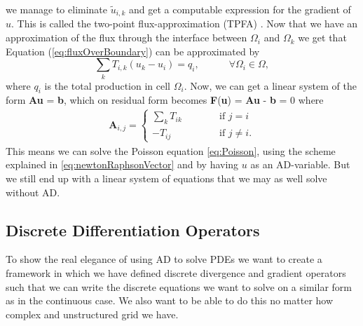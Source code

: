we manage to eliminate $\tilde{u}_{i,k}$ and get a computable expression for the gradient of $u$. This is called the two-point flux-approximation (TPFA) \emph{\citep{lieMrstUrl}}. Now that we have an approximation of the flux through the interface between $\Omega_i$ and $\Omega_k$ we get that Equation (\ref{eq:fluxOverBoundary}) can be approximated by 
\begin{equation}
    \sum_k T_{i,k}(u_k - u_i) = q_i, \hspace{3em} \forall \Omega_i \in \Omega,
    \label{eq:PoissonSolvableTwoCells}
\end{equation}
where $q_i$ is the total production in cell $\Omega_i$. Now, we can get a linear system of the form \textbf{A}\textbf{u} = \textbf{b},  which on residual form becomes \textbf{F}(\textbf{u}) = \textbf{A}\textbf{u} - \textbf{b} = 0 where
\begin{align*}
    \textbf{A}_{i,j} = 
    \left\lbrace
    \begin{array}{lr}
    \sum_k T_{ik} \hspace{3em}&\text{if } j = i\\
    -T_{ij} \hspace{3em}&\text{if } j \neq i.
    \end{array}
    \right.
\end{align*}
This means we can solve the Poisson equation \eqref{eq:Poisson}, using the scheme explained in \eqref{eq:newtonRaphsonVector} and by having $u$ as an AD-variable. But we still end up with a linear system of equations that we may as well solve without AD. 

\subsection{Discrete Differentiation Operators}
To show the real elegance of using AD to solve PDEs we want to create a framework in which we have defined discrete divergence and gradient operators such that we can write the discrete equations we want to solve on a similar form as in the continuous case. We also want to be able to do this no matter how complex and unstructured grid we have.

